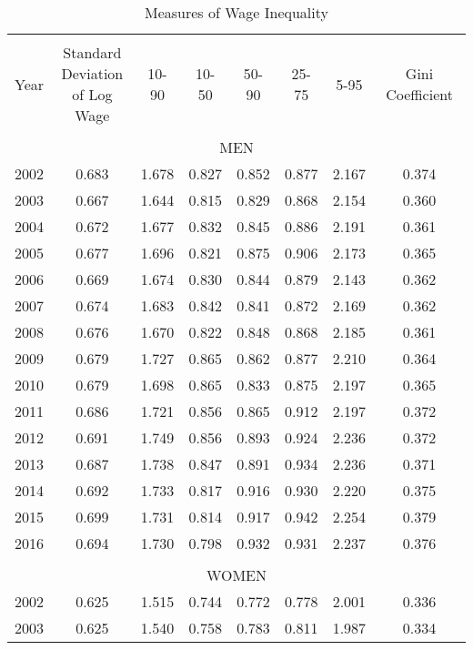 
\begin{table}[!htbp] \centering 
  \caption{Measures of Wage Inequality} 
  \label{tab:tab_wage_ineq_measures} 
\begin{tabular}{@{\extracolsep{5pt}} cccccccc} 
\\[-1.8ex]\hline 
\hline \\[-1.8ex] 
Year & \thead{Standard \\ Deviation \\ of Log Wage} & 10-90 & 10-50 & 50-90 & 25-75 & 5-95 & Gini Coefficient \\ 
\hline \\[-1.8ex] 
\multicolumn{8}{c}{MEN} \\
2002 & 0.683 & 1.678 & 0.827 & 0.852 & 0.877 & 2.167 & 0.374 \\ 
2003 & 0.667 & 1.644 & 0.815 & 0.829 & 0.868 & 2.154 & 0.360 \\ 
2004 & 0.672 & 1.677 & 0.832 & 0.845 & 0.886 & 2.191 & 0.361 \\ 
2005 & 0.677 & 1.696 & 0.821 & 0.875 & 0.906 & 2.173 & 0.365 \\ 
2006 & 0.669 & 1.674 & 0.830 & 0.844 & 0.879 & 2.143 & 0.362 \\ 
2007 & 0.674 & 1.683 & 0.842 & 0.841 & 0.872 & 2.169 & 0.362 \\ 
2008 & 0.676 & 1.670 & 0.822 & 0.848 & 0.868 & 2.185 & 0.361 \\ 
2009 & 0.679 & 1.727 & 0.865 & 0.862 & 0.877 & 2.210 & 0.364 \\ 
2010 & 0.679 & 1.698 & 0.865 & 0.833 & 0.875 & 2.197 & 0.365 \\ 
2011 & 0.686 & 1.721 & 0.856 & 0.865 & 0.912 & 2.197 & 0.372 \\ 
2012 & 0.691 & 1.749 & 0.856 & 0.893 & 0.924 & 2.236 & 0.372 \\ 
2013 & 0.687 & 1.738 & 0.847 & 0.891 & 0.934 & 2.236 & 0.371 \\ 
2014 & 0.692 & 1.733 & 0.817 & 0.916 & 0.930 & 2.220 & 0.375 \\ 
2015 & 0.699 & 1.731 & 0.814 & 0.917 & 0.942 & 2.254 & 0.379 \\ 
2016 & 0.694 & 1.730 & 0.798 & 0.932 & 0.931 & 2.237 & 0.376 \\ 
\hline \\[-1.8ex] 
\multicolumn{8}{c}{WOMEN} \\
2002 & 0.625 & 1.515 & 0.744 & 0.772 & 0.778 & 2.001 & 0.336 \\ 
2003 & 0.625 & 1.540 & 0.758 & 0.783 & 0.811 & 1.987 & 0.334 \\ 

\end{tabular}
\end{table}

